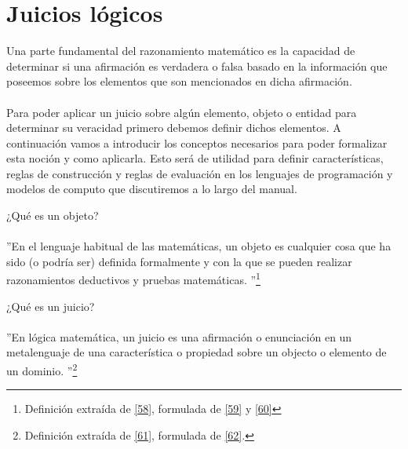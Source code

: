 \section{Juicios lógicos}

    Una parte fundamental del razonamiento matemático es la capacidad de determinar si una afirmación es verdadera o falsa basado en la información que poseemos sobre los elementos que son mencionados en dicha afirmación. \\\\
    Para poder aplicar un juicio sobre algún elemento, objeto o entidad para determinar su veracidad primero debemos definir dichos elementos. A continuación vamos a introducir los conceptos necesarios para poder formalizar esta noción y como aplicarla. Esto será de utilidad para definir características, reglas de construcción y reglas de evaluación en los lenguajes de programación y modelos de computo que discutiremos a lo largo del manual.\\

    \bigskip

    \begin{exercise}
	¿Qué es un objeto? \\  \\
	   ''En el lenguaje habitual de las matemáticas, un objeto es cualquier cosa que ha sido (o podría ser) definida formalmente y con la que se pueden realizar razonamientos deductivos y pruebas matemáticas. ''\footnote{Definición extraída de \hyperlink{58}{[58]}, formulada de  \hyperlink{59}{[59]} y \hyperlink{60}{[60]}}
    \end{exercise}

    \begin{exercise}
	¿Qué es un juicio? \\ \\
         ''En lógica matemática, un juicio es una afirmación o enunciación en un metalenguaje de una característica o propiedad sobre un objecto o elemento de un dominio. ''\footnote{Definición extraída de \hyperlink{61}{[61]}, formulada de \hyperlink{62}{[62]}.}
    \end{exercise} 


